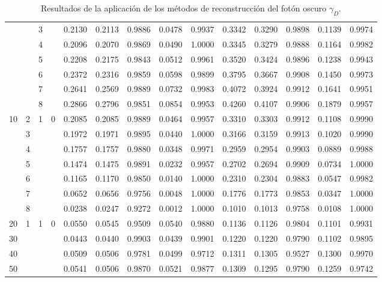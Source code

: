 \begin{landscape}
\begin{table}[!t]
\begin{tabular}{|cccc|c|cc|cc|c|cc|cc|}
	& 	& 3 & 		& 0.2130& 0.2113& 0.9886& 0.0478& 0.9937& 0.3342& 0.3290& 0.9898& 0.1139& 0.9974\\
	& 	& 4 & 		& 0.2096& 0.2070& 0.9869& 0.0490& 1.0000& 0.3345& 0.3279& 0.9888& 0.1164& 0.9982\\
	& 	& 5 & 		& 0.2208& 0.2175& 0.9843& 0.0512& 0.9961& 0.3520& 0.3424& 0.9896& 0.1238& 0.9943\\
	&	& 6 &		& 0.2372& 0.2316& 0.9859& 0.0598& 0.9899& 0.3795& 0.3667& 0.9908& 0.1450& 0.9973\\
	& 	& 7 & 		& 0.2641& 0.2569& 0.9889& 0.0732& 0.9983& 0.4072& 0.3924& 0.9912& 0.1641& 0.9951\\
	&	& 8 & 		& 0.2866& 0.2796& 0.9851& 0.0854& 0.9953& 0.4260& 0.4107& 0.9906& 0.1879& 0.9957\\
\midrule
10 	& 2 & 1 & 0 	& 0.2085& 0.2085& 0.9889& 0.0464& 0.9957& 0.3310& 0.3303& 0.9912& 0.1108& 0.9990\\
	& 3 & 	& 		& 0.1972& 0.1971& 0.9895& 0.0440& 1.0000& 0.3166& 0.3159& 0.9913& 0.1020& 0.9990\\
	& 4 & 	& 		& 0.1757& 0.1757& 0.9880& 0.0348& 0.9971& 0.2959& 0.2954& 0.9903& 0.0889& 0.9988\\
	& 5 & 	& 		& 0.1474& 0.1475& 0.9891& 0.0232& 0.9957& 0.2702& 0.2694& 0.9909& 0.0734& 1.0000\\
	& 6 & 	& 		& 0.1165& 0.1170& 0.9850& 0.0140& 1.0000& 0.2310& 0.2304& 0.9883& 0.0547& 0.9982\\
	& 7 & 	& 		& 0.0652& 0.0656& 0.9756& 0.0048& 1.0000& 0.1776& 0.1773& 0.9853& 0.0347& 1.0000\\
	& 8 & 	& 		& 0.0238& 0.0247& 0.9272& 0.0012& 1.0000& 0.1010& 0.1013& 0.9758& 0.0108& 1.0000\\
\midrule
20 	& 1 & 1 & 0 	& 0.0550& 0.0545& 0.9509& 0.0540& 0.9880& 0.1136& 0.1126& 0.9804& 0.1101& 0.9931\\
30 	& 	& 	& 		& 0.0443& 0.0440& 0.9903& 0.0439& 0.9901& 0.1220& 0.1220&	0.9790& 0.1102& 0.9895\\
40 	& 	& 	& 		& 0.0509& 0.0506& 0.9781& 0.0499& 0.9712& 0.1311& 0.1305& 0.9527&	0.1300& 0.9970\\
50 	& 	& 	& 		& 0.0541& 0.0506& 0.9870& 0.0521& 0.9877& 0.1309& 0.1295&	0.9790&	0.1259& 0.9742\\
\bottomrule 
\end{tabular}
\caption{Resultados de la aplicación de los métodos de reconstrucción del fotón oscuro $\gamma_D$.}
\label{fotones_reconstruidos}
\end{table}
\end{landscape} 



